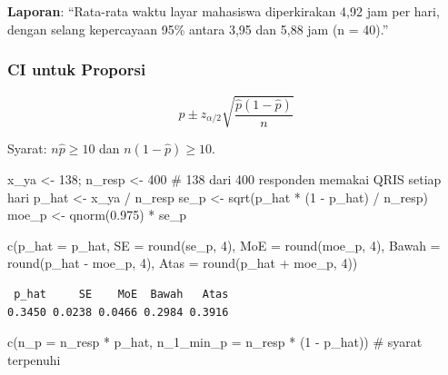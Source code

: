\documentclass[
  indonesian,
  letterpaper,
]{book}
\newenvironment{Shaded}{\begin{snugshade}}{\end{snugshade}}
\newcommand{\AttributeTok}[1]{\textcolor[rgb]{0.40,0.45,0.13}{#1}}
\newcommand{\CommentTok}[1]{\textcolor[rgb]{0.37,0.37,0.37}{#1}}
\newcommand{\DecValTok}[1]{\textcolor[rgb]{0.68,0.00,0.00}{#1}}
\newcommand{\FloatTok}[1]{\textcolor[rgb]{0.68,0.00,0.00}{#1}}
\newcommand{\FunctionTok}[1]{\textcolor[rgb]{0.28,0.35,0.67}{#1}}
\newcommand{\NormalTok}[1]{\textcolor[rgb]{0.00,0.23,0.31}{#1}}
\newcommand{\OtherTok}[1]{\textcolor[rgb]{0.00,0.23,0.31}{#1}}
\newcommand{\SpecialCharTok}[1]{\textcolor[rgb]{0.37,0.37,0.37}{#1}}
\begin{document}
\textbf{Laporan}: ``Rata-rata waktu layar mahasiswa diperkirakan 4,92
jam per hari, dengan selang kepercayaan 95\% antara 3,95 dan 5,88 jam (n
= 40).''

\subsubsection{CI untuk Proporsi}\label{ci-untuk-proporsi}

\[
\hat{p} \pm z_{\alpha/2}\sqrt{\frac{\hat{p}(1-\hat{p})}{n}}
\]

Syarat: \(n\hat{p} \ge 10\) dan \(n(1-\hat{p}) \ge 10\).

\begin{Shaded}
\begin{Highlighting}[]
\NormalTok{x\_ya   }\OtherTok{\textless{}{-}} \DecValTok{138}\NormalTok{; n\_resp }\OtherTok{\textless{}{-}} \DecValTok{400}   \CommentTok{\# 138 dari 400 responden memakai QRIS setiap hari}
\NormalTok{p\_hat  }\OtherTok{\textless{}{-}}\NormalTok{ x\_ya }\SpecialCharTok{/}\NormalTok{ n\_resp}
\NormalTok{se\_p   }\OtherTok{\textless{}{-}} \FunctionTok{sqrt}\NormalTok{(p\_hat }\SpecialCharTok{*}\NormalTok{ (}\DecValTok{1} \SpecialCharTok{{-}}\NormalTok{ p\_hat) }\SpecialCharTok{/}\NormalTok{ n\_resp)}
\NormalTok{moe\_p  }\OtherTok{\textless{}{-}} \FunctionTok{qnorm}\NormalTok{(}\FloatTok{0.975}\NormalTok{) }\SpecialCharTok{*}\NormalTok{ se\_p}

\FunctionTok{c}\NormalTok{(}\AttributeTok{p\_hat =}\NormalTok{ p\_hat, }\AttributeTok{SE =} \FunctionTok{round}\NormalTok{(se\_p, }\DecValTok{4}\NormalTok{), }\AttributeTok{MoE =} \FunctionTok{round}\NormalTok{(moe\_p, }\DecValTok{4}\NormalTok{),}
  \AttributeTok{Bawah =} \FunctionTok{round}\NormalTok{(p\_hat }\SpecialCharTok{{-}}\NormalTok{ moe\_p, }\DecValTok{4}\NormalTok{), }\AttributeTok{Atas =} \FunctionTok{round}\NormalTok{(p\_hat }\SpecialCharTok{+}\NormalTok{ moe\_p, }\DecValTok{4}\NormalTok{))}
\end{Highlighting}
\end{Shaded}

\begin{verbatim}
 p_hat     SE    MoE  Bawah   Atas 
0.3450 0.0238 0.0466 0.2984 0.3916 
\end{verbatim}

\begin{Shaded}
\begin{Highlighting}[]
\FunctionTok{c}\NormalTok{(}\AttributeTok{n\_p =}\NormalTok{ n\_resp }\SpecialCharTok{*}\NormalTok{ p\_hat, }\AttributeTok{n\_1\_min\_p =}\NormalTok{ n\_resp }\SpecialCharTok{*}\NormalTok{ (}\DecValTok{1} \SpecialCharTok{{-}}\NormalTok{ p\_hat))   }\CommentTok{\# syarat terpenuhi}
\end{Highlighting}
\end{Shaded}
\end{document}
